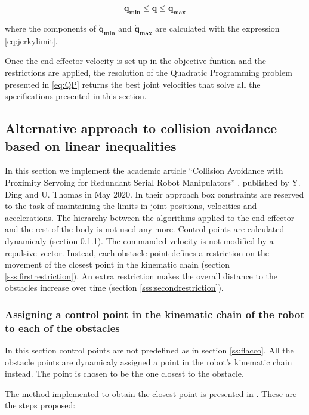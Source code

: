 $$
\mathbf{\dot{q}_{\min}} \leq \mathbf{\dot{q}} \leq \mathbf{\dot{q}_{\max}}
$$

where the components of $\mathbf{\dot{q}_{\min}}$ and $\mathbf{\dot{q}_{\max}}$ are calculated with the expression \ref{eq:jerkylimit}.

Once the end effector velocity is set up in the objective funtion and the restrictions are applied, the resolution of the Quadratic Programming problem presented in \ref{eq:QP} returns the best joint velocities that solve all the specifications presented in this section.


\subsection{Alternative approach to collision avoidance based on linear inequalities}
\label{ss:optimization}

In this section we implement the academic article ``Collision Avoidance with Proximity Servoing for Redundant Serial Robot Manipulators'' \cite{dingcollision}, published by Y. Ding and U. Thomas in May 2020. In their approach box constraints are reserved to the task of maintaining the limits in joint positions, velocities and accelerations. The hierarchy between the algorithms applied to the end effector and the rest of the body is not used any more. Control points are calculated dynamicaly (section \ref{sss:dynamicpoints}). The commanded velocity is not modified by a repulsive vector. Instead, each obstacle point defines a restriction on the movement of the closest point in the kinematic chain (section \ref{sss:firstrestriction}). An extra restriction makes the overall distance to the obstacles increase over time (section \ref{sss:secondrestriction}).

\subsubsection{Assigning a control point in the kinematic chain of the robot to each of the obstacles}
\label{sss:dynamicpoints}

In this section control points are not predefined as in section \ref{ss:flacco}. All the obstacle points are dynamicaly assigned a point in the robot's kinematic chain instead. The point is chosen to be the one closest to the obstacle.

The method implemented to obtain the closest point is presented in \cite{stackexchangeSegment}. These are the steps proposed:

